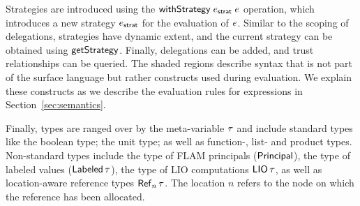 Strategies are introduced using the $\mathsf{withStrategy}\;e_{\mathsf{strat}}\;e$ operation, which introduces a new strategy $e_{\mathsf{strat}}$ for the evaluation of $e$. Similar to the scoping of delegations, strategies have dynamic extent, and the current strategy can be obtained using $\mathsf{getStrategy}$. Finally, delegations can be added, and trust relationships can be queried. The shaded regions describe syntax that is not part of the surface language but rather constructs used during evaluation. We explain these constructs as we describe the evaluation rules for expressions in Section~\ref{sec:semantics}.


Finally, types are ranged over by the meta-variable $\tau$ and include standard types like the boolean type; the unit type; as well as function-, list- and product types. Non-standard types include the type of FLAM principals ($\mathsf{Principal}$), the type of labeled values ($\mathsf{Labeled}\,\tau$), the type of LIO computations $\mathsf{LIO}\,\tau$, as well as location-aware reference types $\reftype[n]{\type}$. The location $n$ refers to the node on which the reference has been allocated.

